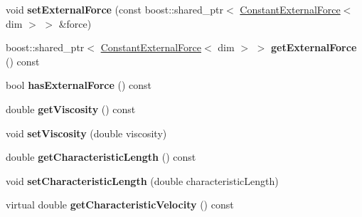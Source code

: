 \begin{DoxyCompactItemize}
\item 
\hypertarget{classnatrium_1_1ProblemDescription_a02ed1361dced4a544fea2c50af06fe65}{
void {\bfseries setExternalForce} (const boost::shared\_\-ptr$<$ \hyperlink{classnatrium_1_1ConstantExternalForce}{ConstantExternalForce}$<$ dim $>$ $>$ \&force)}
\label{classnatrium_1_1ProblemDescription_a02ed1361dced4a544fea2c50af06fe65}

\item 
\hypertarget{classnatrium_1_1ProblemDescription_a9989950e9e18966c6600ab4fd80b5009}{
boost::shared\_\-ptr$<$ \hyperlink{classnatrium_1_1ConstantExternalForce}{ConstantExternalForce}$<$ dim $>$ $>$ {\bfseries getExternalForce} () const }
\label{classnatrium_1_1ProblemDescription_a9989950e9e18966c6600ab4fd80b5009}

\item 
\hypertarget{classnatrium_1_1ProblemDescription_a5527b8c5da6a4decb34bf34cd02a6734}{
bool {\bfseries hasExternalForce} () const }
\label{classnatrium_1_1ProblemDescription_a5527b8c5da6a4decb34bf34cd02a6734}

\item 
\hypertarget{classnatrium_1_1ProblemDescription_a582ecf296837d78a8a00fd598de38de2}{
double {\bfseries getViscosity} () const }
\label{classnatrium_1_1ProblemDescription_a582ecf296837d78a8a00fd598de38de2}

\item 
\hypertarget{classnatrium_1_1ProblemDescription_ad624cab941ab79af0422e5f7c735e8d8}{
void {\bfseries setViscosity} (double viscosity)}
\label{classnatrium_1_1ProblemDescription_ad624cab941ab79af0422e5f7c735e8d8}

\item 
\hypertarget{classnatrium_1_1ProblemDescription_ac424dbc36ad2d61d128f3656a8d6952d}{
double {\bfseries getCharacteristicLength} () const }
\label{classnatrium_1_1ProblemDescription_ac424dbc36ad2d61d128f3656a8d6952d}

\item 
\hypertarget{classnatrium_1_1ProblemDescription_adc48f96c34c6318d911bbc41582c202b}{
void {\bfseries setCharacteristicLength} (double characteristicLength)}
\label{classnatrium_1_1ProblemDescription_adc48f96c34c6318d911bbc41582c202b}

\item 
\hypertarget{classnatrium_1_1ProblemDescription_a3af2ccea3bfbb7d1aa39570579fcf937}{
virtual double {\bfseries getCharacteristicVelocity} () const }
\label{classnatrium_1_1ProblemDescription_a3af2ccea3bfbb7d1aa39570579fcf937}

\end{DoxyCompactItemize}
